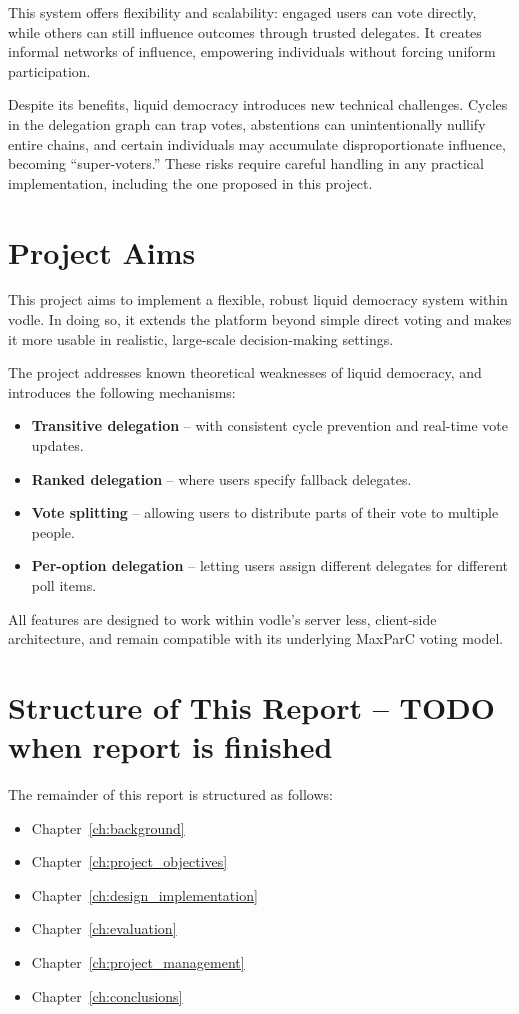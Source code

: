 This system offers flexibility and scalability: engaged users can vote directly, while others can still influence outcomes through trusted delegates. It creates informal networks of influence, empowering individuals without forcing uniform participation.

Despite its benefits, liquid democracy introduces new technical challenges. Cycles in the delegation graph can trap votes, abstentions can unintentionally nullify entire chains, and certain individuals may accumulate disproportionate influence, becoming ``super-voters.'' These risks require careful handling in any practical implementation, including the one proposed in this project.

\section{Project Aims}

This project aims to implement a flexible, robust liquid democracy system within vodle. In doing so, it extends the platform beyond simple direct voting and makes it more usable in realistic, large-scale decision-making settings.

The project addresses known theoretical weaknesses of liquid democracy, and introduces the following mechanisms:
\begin{itemize}
  \item \textbf{Transitive delegation} -- with consistent cycle prevention and real-time vote updates.
  \item \textbf{Ranked delegation} -- where users specify fallback delegates.
  \item \textbf{Vote splitting} -- allowing users to distribute parts of their vote to multiple people.
  \item \textbf{Per-option delegation} -- letting users assign different delegates for different poll items.
\end{itemize}

All features are designed to work within vodle's server less, client-side architecture, and remain compatible with its underlying MaxParC voting model.

\section{Structure of This Report -- TODO when report is finished}

The remainder of this report is structured as follows:

\begin{itemize}
  \item Chapter~\ref{ch:background}
  \item Chapter~\ref{ch:project_objectives}
  \item Chapter~\ref{ch:design_implementation}
  \item Chapter~\ref{ch:evaluation}
  \item Chapter~\ref{ch:project_management}
  \item Chapter~\ref{ch:conclusions}
\end{itemize}